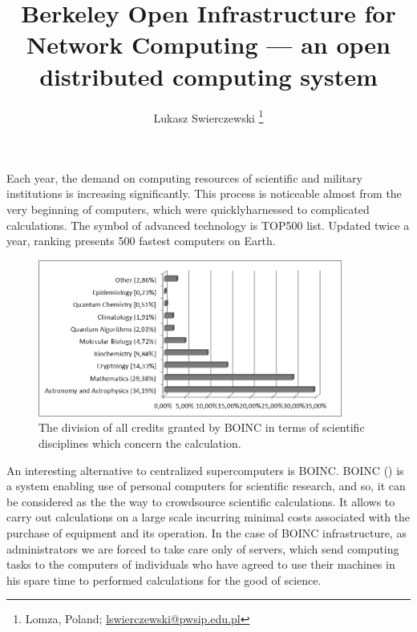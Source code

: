 \documentclass[10pt, a5paper]{article}
\begin{document}
\title{Berkeley Open Infrastructure for Network Computing — an open distributed computing system}
\author{Lukasz Swierczewski \footnote{Lomza, Poland; \url{lswierczewski@pwsip.edu.pl}}}
\maketitle
Each year, the demand on computing resources of scientific and military institutions is increasing significantly. This process is noticeable almost from the very beginning of computers, which were quickly\linebreak harnessed to complicated calculations. The symbol of advanced \linebreak technology is TOP500 list. Updated twice a year, ranking presents 500 fastest computers on Earth.

\begin{figure}[h!]
  \centering
  \includegraphics[width=10cm]{104_2013_w_Swierczewski_boinc_1}
  \caption{The division of all credits granted by BOINC in terms of scientific disciplines which concern the calculation.}\label{fig:swier1}
\end{figure}

An interesting alternative to centralized supercomputers is BOINC. BOINC (\cite{swier1}) is a system enabling use of personal computers for scientific research, and so, it can be considered as the the way to crowdsource scientific calculations. It allows to carry out calculations on a large scale incurring minimal costs associated with the purchase of equipment and its operation. In the case of BOINC infrastructure, as administrators we are forced to take care only of servers, which send computing tasks to the computers of individuals who have agreed to use their machines in his spare time to performed calculations for the good of science.
\end{document}
